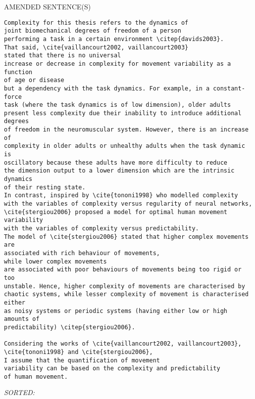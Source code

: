 \documentclass[12pt]{article}
\begin{document}
\begin{enumerate}
AMENDED SENTENCE(S) \\
	\begin{verbatim}
Complexity for this thesis refers to the dynamics of 
joint biomechanical degrees of freedom of a person 
performing a task in a certain environment \citep{davids2003}.
That said, \cite{vaillancourt2002, vaillancourt2003} 
stated that there is no universal 
increase or decrease in complexity for movement variability as a function 
of age or disease 
but a dependency with the task dynamics. For example, in a constant-force 
task (where the task dynamics is of low dimension), older adults 
present less complexity due their inability to introduce additional degrees 
of freedom in the neuromuscular system. However, there is an increase of 
complexity in older adults or unhealthy adults when the task dynamic is 
oscillatory because these adults have more difficulty to reduce 
the dimension output to a lower dimension which are the intrinsic dynamics 
of their resting state.
In contrast, inspired by \cite{tononi1998} who modelled complexity
with the variables of complexity versus regularity of neural networks,
\cite{stergiou2006} proposed a model for optimal human movement variability
with the variables of complexity versus predictability.
The model of \cite{stergiou2006} stated that higher complex movements are 
associated with rich behaviour of movements,
while lower complex movements 
are associated with poor behaviours of movements being too rigid or too 
unstable. Hence, higher complexity of movements are characterised by 
chaotic systems, while lesser complexity of movement is characterised either 
as noisy systems or periodic systems (having either low or high amounts of 
predictability) \citep{stergiou2006}.

Considering the works of \cite{vaillancourt2002, vaillancourt2003}, 
\cite{tononi1998} and \cite{stergiou2006}, 
I assume that the quantification of movement 
variability can be based on the complexity and predictability 
of human movement.	
	\end{verbatim}
	\textit{
	SORTED:  
	}
	\\











%
%












\end{enumerate}
\end{document}
